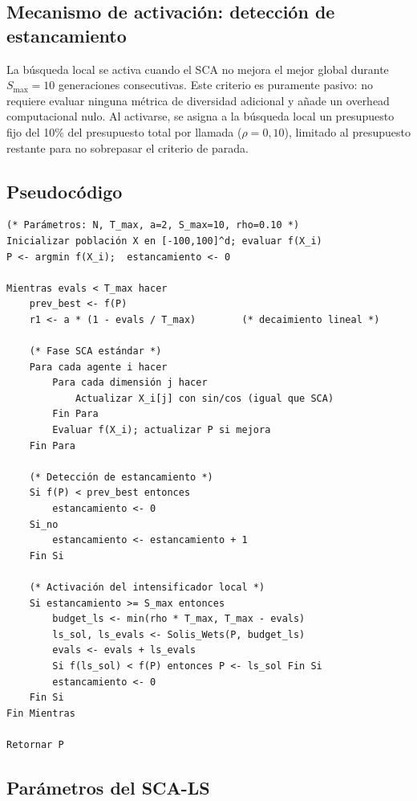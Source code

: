 \documentclass[12pt,a4paper]{article}
\begin{document}
\subsection{Mecanismo de activación: detección de estancamiento}

La búsqueda local se activa cuando el SCA no mejora el mejor global durante $S_{\max} = 10$ generaciones consecutivas. Este criterio es puramente pasivo: no requiere evaluar ninguna métrica de diversidad adicional y añade un overhead computacional nulo. Al activarse, se asigna a la búsqueda local un presupuesto fijo del 10\% del presupuesto total por llamada ($\rho = 0{,}10$), limitado al presupuesto restante para no sobrepasar el criterio de parada.

\subsection{Pseudocódigo}

\begin{lstlisting}[caption={Pseudocódigo del SCA-LS (SCA + Solis-Wets)}, label={lst:sca_ls}]
(* Parámetros: N, T_max, a=2, S_max=10, rho=0.10 *)
Inicializar población X en [-100,100]^d; evaluar f(X_i)
P <- argmin f(X_i);  estancamiento <- 0

Mientras evals < T_max hacer
    prev_best <- f(P)
    r1 <- a * (1 - evals / T_max)        (* decaimiento lineal *)

    (* Fase SCA estándar *)
    Para cada agente i hacer
        Para cada dimensión j hacer
            Actualizar X_i[j] con sin/cos (igual que SCA)
        Fin Para
        Evaluar f(X_i); actualizar P si mejora
    Fin Para

    (* Detección de estancamiento *)
    Si f(P) < prev_best entonces
        estancamiento <- 0
    Si_no
        estancamiento <- estancamiento + 1
    Fin Si

    (* Activación del intensificador local *)
    Si estancamiento >= S_max entonces
        budget_ls <- min(rho * T_max, T_max - evals)
        ls_sol, ls_evals <- Solis_Wets(P, budget_ls)
        evals <- evals + ls_evals
        Si f(ls_sol) < f(P) entonces P <- ls_sol Fin Si
        estancamiento <- 0
    Fin Si
Fin Mientras

Retornar P
\end{lstlisting}

\subsection{Parámetros del SCA-LS}
\end{document}
